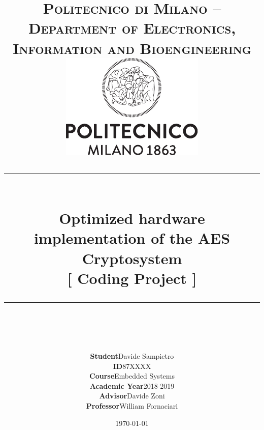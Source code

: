 \documentclass[12pt,a4paper,titlepage]{article}
\title{
  \vspace{-1in}
  \textsc{Politecnico di Milano -- Department of Electronics, Information and Bioengineering} \\[1cm]
  \includegraphics[scale=1.2]{polimi} \\[1cm]
  \rule{\linewidth}{0.5pt} \\[0.4cm]
  \huge \textbf{Optimized hardware implementation of the AES Cryptosystem} \\[.5cm] %
  \large [ Coding Project ] \\
  \rule{\linewidth}{0.5pt} \\[0.4cm]
} %
\author{
  \begin{tabular}{r l}
    \textbf{Student} & Davide Sampietro \\
    \textbf{ID} & 87XXXX \\[0.5cm]
    \textbf{Course} & Embedded Systems \\
    \textbf{Academic Year} & 2018-2019 \\[0.5cm]
    \textbf{Advisor} & Davide Zoni \\
    \textbf{Professor} & William Fornaciari \\
  \end{tabular}
} %
\date{
  \vfill
  \normalsize\today
}
\begin{document}
\nocite{*}

\maketitle
\tableofcontents
\pagebreak








\end{document}
